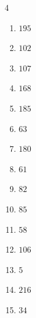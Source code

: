 \begin{multicols}{4}
\begin{enumerate}

  \item $195$


  \item $102$


  \item $107$


  \item $168$


  \item $185$


  \item $63$


  \item $180$


  \item $61$


  \item $82$


\columnbreak %

\resetques

  \item $85$


  \item $58$


  \item $106$


  \item $5$


  \item $216$


  \item $34$


\end{enumerate}
\end{multicols}

